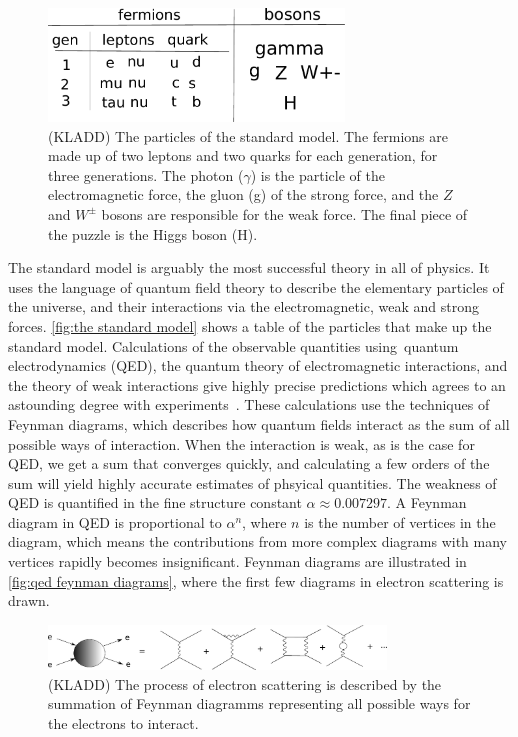 \begin{figure}[h]
    \centering
    \includegraphics[width=0.7\textwidth]{figurer/standard_model.pdf}
    \caption{(KLADD) The particles of the standard model. The fermions are made up of two leptons and two quarks for each generation, for three generations. The photon ($\gamma$) is the particle of the electromagnetic force, the gluon (g) of the strong force, and the $Z$ and $W^\pm$ bosons are responsible for the weak force. The final piece of the puzzle is the Higgs boson (H).}
    \label{fig:the standard model}
\end{figure}


The standard model is arguably the most successful theory in all of physics.
It uses the language of quantum field theory to describe the elementary particles of the universe, and their interactions via the electromagnetic, weak and strong forces.
\autoref{fig:the standard model} shows a table of the particles that make up the standard model.
Calculations of the observable quantities using quantum electrodynamics (QED), the quantum theory of electromagnetic interactions, and the theory of weak interactions give highly precise predictions which agrees to an astounding degree with experiments~\cite{Schwartz:QFT}.
These calculations use the techniques of Feynman diagrams, which describes how quantum fields interact as the sum of all possible ways of interaction.
When the interaction is weak, as is the case for QED, we get a sum that converges quickly, and calculating a few orders of the sum will yield highly accurate estimates of phsyical quantities.
The weakness of QED is quantified in the fine structure constant $\alpha \approx 0.00 7297$\cite{PDG}.
A Feynman diagram in QED is proportional to $\alpha^n$, where $n$ is the number of vertices in the diagram, which means the contributions from more complex diagrams with many vertices rapidly becomes insignificant.
Feynman diagrams are illustrated in \autoref{fig:qed feynman diagrams}, where the first few diagrams in electron scattering is drawn.

\begin{figure}
    \centering
    \includegraphics[width=0.8\textwidth]{figurer/electron_scattering.pdf}
    \caption{(KLADD) The process of electron scattering is described by the summation of Feynman diagramms representing all possible ways for the electrons to interact. }
    \label{fig:qed feynman diagrams}
\end{figure}

